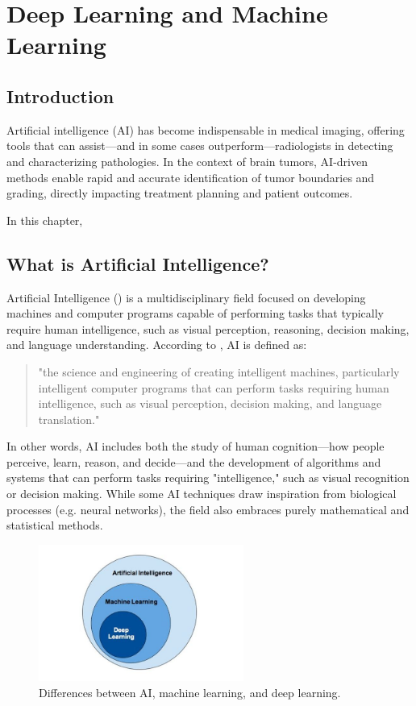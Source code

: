\chapter{Deep Learning and Machine Learning}

\section{Introduction}
\label{sec:intro}
Artificial intelligence (AI) has become indispensable in medical imaging, offering tools that can assist—and in some cases outperform—radiologists in detecting and characterizing pathologies. In the context of brain tumors, AI-driven methods enable rapid and accurate identification of tumor boundaries and grading, directly impacting treatment planning and patient outcomes.

In this chapter,


\section{What is Artificial Intelligence?}

Artificial Intelligence () is a multidisciplinary field focused on developing machines and computer programs capable of performing tasks that typically require human intelligence, such as visual perception, reasoning, decision making, and language understanding. According to \cite{sciencedirect_ai_overview}, AI is defined as:

\begin{quotation}
  "the science and engineering of creating intelligent machines, particularly intelligent computer programs that can perform tasks requiring human intelligence, such as visual perception, decision making, and language translation."
\end{quotation}

In other words, AI includes both the study of human cognition—how people perceive, learn, reason, and decide—and the development of algorithms and systems that can perform tasks requiring "intelligence," such as visual recognition or decision making. While some AI techniques draw inspiration from biological processes (e.g. neural networks), the field also embraces purely mathematical and statistical methods.

\begin{figure}[H]
  \centering
  \includegraphics[width=0.6\textwidth]{Images/Chapter1/ai.jpg}
  \caption{Differences between AI, machine learning, and deep learning. \cite{thakkar2020aivsmlvsdl}}
  \label{fig:ai}
\end{figure}

